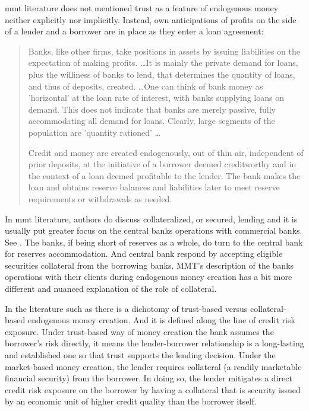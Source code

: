 \ac{mmt} literature does not mentioned trust as a feature of endogenous money neither explicitly nor implicitly. Instead, own anticipations of profits on the side of a lender and a borrower are in place as they enter a loan agreement:

\begin{quote}
Banks, like other firms, take positions in assets by issuing liabilities on the expectation of making profits. \dots It is mainly the private demand for loans, plus the williness of banks to lend, that determines the quantity of loans, and thus of deposits, created. \dots One can think of bank money as 'horizontal' at the loan rate of interest, with banks supplying loans on demand. This does not indicate that banks are merely passive, fully accommodating all demand for loans. Clearly, large segments of the population are 'quantity rationed' \dots~\citep[pp.~109-110]{wray1998} \par
Credit and money are created endogenously, out of thin air, independent of
prior deposits, at the initiative of a borrower deemed creditworthy and in the context
of a loan deemed profitable to the lender. The bank makes the loan and obtains reserve
balances and liabilities later to meet reserve requirements or withdrawals as needed.~\citep[p.~190]{fullwiler2013}
\end{quote}

In \ac{mmt} literature, authors do discuss collateralized, or secured, lending and it is usually put greater focus on the central banks operations with commercial banks. See \cite{tymoigne2009,fullwiler2013,wray1998}. The banks, if being short of reserves as a whole, do turn to the central bank for reserves accommodation. And central bank respond by accepting eligible securities collateral from the borrowing banks. MMT's description of the banks operations with their clients during endogenous money creation has a bit more different and nuanced explanation of the role of collateral.

In the literature such as \cite{gabor2018} there is a dichotomy of trust-based versus collateral-based endogenous money creation. And it is defined along the line of credit risk exposure. Under trust-based way of money creation the bank assumes the borrower's risk directly, it means the lender-borrower relationship is a long-lasting and established one so that trust supports the lending decision. Under the market-based money creation, the lender requires collateral (a readily marketable financial security) from the borrower. In doing so, the lender mitigates a direct credit risk exposure on the borrower by having a collateral that is security issued by an economic unit of higher credit quality than the borrower itself. 

